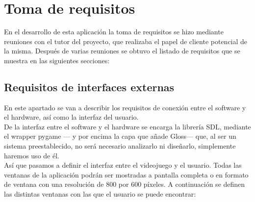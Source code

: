 
\section{Toma de requisitos}

En el desarrollo de esta aplicación la toma de requisitos se hizo mediante reuniones con el tutor del proyecto,
que realizaba el papel de cliente potencial de la misma. Después de varias reuniones se obtuvo el listado de requisitos
que se muestra en las siguientes secciones:


\subsection{Requisitos de interfaces externas}

En este apartado se van a describir los requisitos de conexión entre el software y el hardware, así como la interfaz
del usuario.\\

De la interfaz entre el software y el hardware se encarga la librería SDL, mediante el wrapper pygame --- y por encima
la capa que añade Gloss--- que, al ser un sistema preestablecido, no será necesario analizarlo ni diseñarlo,
simplemente haremos uso de él.\\

Así que pasamos a definir el interfaz entre el videojuego y el usuario. Todas las ventanas de la aplicación podrán
ser mostradas a pantalla completa o en formato de ventana con una resolución de 800 por 600 píxeles. A
continuación se definen las distintas ventanas con las que el usuario se puede encontrar:

